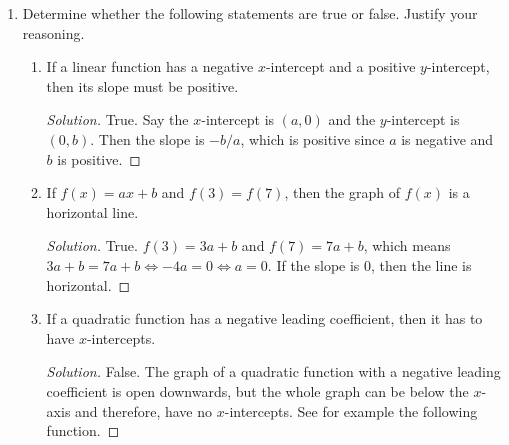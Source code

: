 \documentclass[12pt]{article}
\newenvironment{solution}{\begin{proof}[Solution]}{\end{proof}}
\begin{document}
\begin{enumerate}
		
		\item Determine whether the following statements are true or false. Justify your reasoning.
		\begin{enumerate}
			\item If a linear function has a negative $x$-intercept and a positive $y$-intercept, then its slope must be positive.
			\begin{solution}
				True. Say the $x$-intercept is $(a,0)$ and the $y$-intercept is $(0,b)$. Then the slope is $-b/a$, which is positive since $a$ is negative and $b$ is positive.
			\end{solution}
			\item If $f(x)=ax+b$ and $f(3)=f(7)$, then the graph of $f(x)$ is a horizontal line.
			\begin{solution}
				True. $f(3)=3a+b$ and $f(7)=7a+b$, which means $3a+b=7a+b \iff -4a=0 \iff a=0$. If the slope is 0, then the line is horizontal.
			\end{solution}
			\item If a quadratic function has a negative leading coefficient, then it has to have $x$-intercepts.
			\begin{solution}
				False. The graph of a quadratic function with a negative leading coefficient is open downwards, but the whole graph can be below the $x$-axis and therefore, have no $x$-intercepts. See for example the following function.
				

\end{solution}
\end{enumerate}
\end{enumerate}
\end{document}
